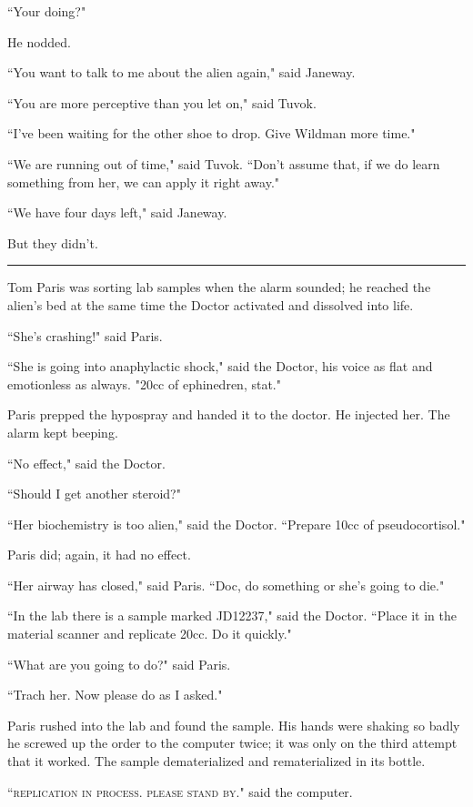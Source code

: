 \documentclass[twoside,letterpaper,12pt]{memoir}
\begin{document}
``Your doing?" 

He nodded. 

``You want to talk to me about the alien again," said Janeway. 

``You are more perceptive than you let on," said Tuvok. 

``I've been waiting for the other shoe to drop. Give Wildman more time." 

``We are running out of time," said Tuvok. ``Don't assume that, if we do learn something from her, we can apply it right away." 

``We have four days left," said Janeway. 

But they didn't. 

\begin{center}\rule{3cm}{0.4 pt}\end{center} 

Tom Paris was sorting lab samples when the alarm sounded; he reached the alien's bed at the same time the Doctor activated and dissolved into life. 

``She's crashing!" said Paris. 

``She is going into anaphylactic shock," said the Doctor, his voice as flat and emotionless as always. "20cc of ephinedren, stat." 

Paris prepped the hypospray and handed it to the doctor. He injected her. The alarm kept beeping. 

``No effect," said the Doctor. 

``Should I get another steroid?" 

``Her biochemistry is too alien," said the Doctor. ``Prepare 10cc of pseudocortisol." 

Paris did; again, it had no effect. 

``Her airway has closed," said Paris. ``Doc, do something or she's going to die." 

``In the lab there is a sample marked JD12237," said the Doctor. ``Place it in the material scanner and replicate 20cc. Do it quickly." 

``What are you going to do?" said Paris. 

``Trach her. Now please do as I asked." 

Paris rushed into the lab and found the sample. His hands were shaking so badly he screwed up the order to the computer twice; it was only on the third attempt that it worked. The sample dematerialized and rematerialized in its bottle. 

``\textsc{replication in process. please stand by}." said the computer. 
\end{document}
